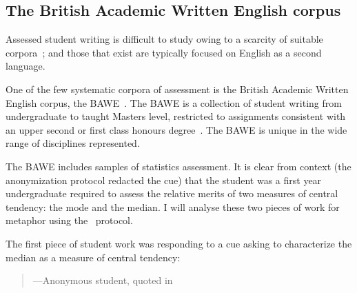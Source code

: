 

\subsection{The British Academic Written English corpus}

Assessed student writing is difficult to study owing to a scarcity of
suitable corpora~\citep{nesi2004}; and those that exist are typically
focused on English as a second language.

One of the few systematic corpora of assessment is the British
Academic Written English corpus, the BAWE~\citep{bawe2016}.  The BAWE
is a collection of student writing from undergraduate to taught
Masters level, restricted to assignments consistent with an upper
second or first class honours degree~\citep{nesi2012}.  The BAWE is
unique in the wide range of disciplines represented.

The BAWE includes samples of statistics assessment.  It is clear from
context (the anonymization protocol redacted the cue) that the student
was a first year undergraduate required to assess the relative merits
of two measures of central tendency: the mode and the median.  I will
analyse these two pieces of work for metaphor using
the~ protocol.

The first piece of student work was responding to a cue asking to
characterize the median as a measure of central tendency:

\begin{singlespace}
\begin{quote}
---Anonymous student, quoted in 
\end{quote}
\end{singlespace}

